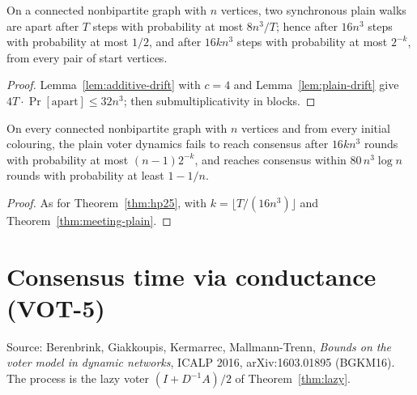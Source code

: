 \begin{theorem}\label{thm:meeting-plain}
\leanok{}
On a connected nonbipartite graph with $n$ vertices, two synchronous plain walks are apart after
$T$ steps with probability at most $8n^3/T$; hence after $16n^3$ steps with probability at most
$1/2$, and after $16kn^3$ steps with probability at most $2^{-k}$, from every pair of start
vertices.
\end{theorem}
\begin{proof}\leanok
Lemma~\ref{lem:additive-drift} with $c=4$ and Lemma~\ref{lem:plain-drift} give
$4T\cdot\Pr[\text{apart}]\le 32n^3$; then submultiplicativity in blocks.
\end{proof}
\begin{theorem}\label{thm:hp25-plain}
\leanok{}
On every connected nonbipartite graph with $n$ vertices and from every initial colouring, the
plain voter dynamics fails to reach consensus after $16kn^3$ rounds with probability at most
$(n-1)2^{-k}$, and reaches consensus within $80\,n^3\log n$ rounds with probability at least
$1-1/n$.
\end{theorem}
\begin{proof}\leanok
As for Theorem~\ref{thm:hp25}, with $k=\lfloor T/(16n^3)\rfloor$ and
Theorem~\ref{thm:meeting-plain}.
\end{proof}

\section{Consensus time via conductance (VOT-5)}\label{sec:bgkm-conductance}
Source: Berenbrink, Giakkoupis, Kermarrec, Mallmann-Trenn, \emph{Bounds on the voter model in
dynamic networks}, ICALP 2016, arXiv:1603.01895 (BGKM16). The process is the lazy voter
$(I+D^{-1}A)/2$ of Theorem~\ref{thm:lazy}.

